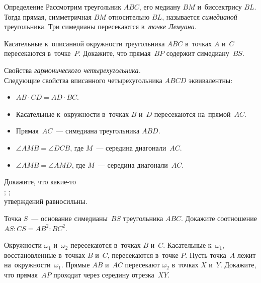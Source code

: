 


\begin{claim}{Определение}
Рассмотрим треугольник $ABC$, его медиану $BM$ и~биссектрису $BL$.
Тогда прямая, симметричная $BM$ относительно $BL$, называется \emph{симедианой}
треугольника.
Три симедианы пересекаются в~\emph{точке Лемуана}.
\end{claim}

\begin{problems}

\item
Касательные к~описанной окружности треугольника $ABC$ в~точках $A$ и~$C$
пересекаются в~точке~$P$.
Докажите, что прямая~$BP$ содержит симедиану~$BS$.

\item
Свойства \emph{гармонического четырехугольника.}
\\
Следующие свойства вписанного четырехугольника $ABCD$ эквивалентны:
\begin{itemize}
    \item
    $AB \cdot CD = AD \cdot BC$.
    \item
    Касательные к~окружности в~точках $B$ и~$D$ пересекаются на~прямой~$AC$.
    \item
    Прямая~$AC$~--- симедиана треугольника $ABD$.
    \item
    $\angle AMB = \angle DCB$, где $M$~--- середина диагонали~$AC$.
    \item
    $\angle AMB = \angle AMD$, где $M$~--- середина диагонали~$AC$.
\end{itemize}
Докажите, что какие-то
\\
;
\qquad
{};
\qquad
{}
\\
утверждений равносильны.

\item
Точка $S$~--- основание симедианы~$BS$ треугольника $ABC$.
Докажите соотношение $AS : CS = AB^2 : BC^2$.

\item
Окружности $\omega_{1}$ и~$\omega_{2}$ пересекаются в~точках $B$ и~$C$.
Касательные к~$\omega_{1}$, восстановленные в~точках $B$ и~$C$, пересекаются
в~точке $P$.
Пусть точка~$A$ лежит на~окружности~$\omega_{1}$.
Прямые $AB$ и~$AC$ пересекают $\omega_{2}$ в~точках $X$ и~$Y$.
Докажите, что прямая~$AP$ проходит через середину отрезка~$XY$.


\end{problems}
